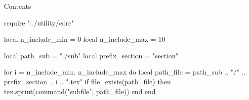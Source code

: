 \documentclass[10pt]{beamer}
\date{\today}
\title{}
\author{}
\begin{document}
\maketitle

\begin{frame}{Contents}
    \tableofcontents
\end{frame}

\begin{luacode*}
    require "../utility/core"

    local n_include_min = 0
    local n_include_max = 10

    local path_sub = "./sub"
    local prefix_section = "section"

    for i = n_include_min, n_include_max do
        local path_file = path_sub .. "/" .. prefix_section .. i .. ".tex"
        if file_exists(path_file) then
            tex.sprint(command("subfile", path_file))
        end
    end
\end{luacode*}



\end{document}
